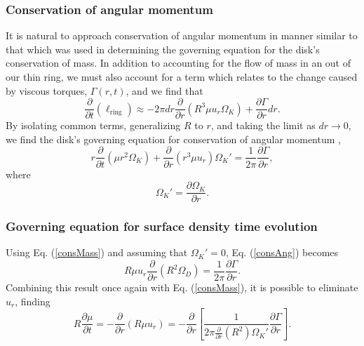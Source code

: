 \documentclass[aps,pra, twocolumn]{revtex4-1}
\begin{document}
\subsubsection{\label{section 2.1.2} Conservation of angular momentum}
It is natural to approach conservation of angular momentum in manner similar to that which was used in determining the governing equation for the disk's conservation of mass. In addition to accounting for the flow of mass in an out of our thin ring, we must also account for a term which relates to the change caused by viscous torques, $\Gamma(r, t)$, and we find that
\begin{equation}
\frac{\partial}{\partial t}\left( \ell_{\text{ring}} \right) \approx  -2\pi dr \frac{\partial}{\partial r}(R^3 \mu u_r \Omega_K) + \frac{\partial \Gamma}{\partial r}dr.
\nonumber
\end{equation}
By isolating common terms, generalizing $R$ to $r$, and taking the limit as $dr \rightarrow 0$, we find the disk's governing equation for conservation of angular momentum \cite{king2002},
\begin{equation}
r \frac{\partial}{\partial t} (\mu r^2 \Omega_K) + \frac{\partial}{\partial r} (r^3 \mu u_r  )\Omega_K' = \frac{1}{2\pi} \frac{\partial \Gamma}{\partial r}, \label{consAng}
\end{equation}
where
\begin{equation}
\Omega_K' = \frac{\partial \Omega_K}{\partial r}. \nonumber
\end{equation}


\subsubsection{\label{section 2.1.3} Governing equation for surface density time evolution}
Using Eq. (\ref{consMass}) and assuming that $\Omega_K' = 0$, Eq. (\ref{consAng}) becomes
\begin{equation}
R\mu u_r \frac{\partial}{\partial r} (R^2 \Omega_D) = \frac{1}{2\pi} \frac{\partial \Gamma}{\partial r}.
\end{equation}
Combining this result once again with Eq. (\ref{consMass}), it is possible to eliminate $u_r$, finding
\begin{equation}
R \frac{\partial \mu}{\partial t} = -\frac{\partial}{\partial r}(R \mu u_r) = - \frac{\partial}{\partial r}\left[ \frac{1}{2\pi \frac{\partial}{\partial r}(R^2)\Omega_K'}\frac{\partial \Gamma}{\partial r} \right]. \label{EqMotion1}
\end{equation}
\end{document}
